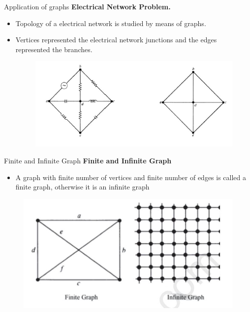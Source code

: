 \documentclass{beamer}
\begin{document}
\begin{frame}{Application of graphs}
	\textbf{Electrical Network Problem.}
	\begin{itemize}
		\item Topology of a electrical network is
		studied by means of graphs. 
		\item Vertices represented the electrical
		network junctions and the edges represented the branches.
		\begin{figure}
			\includegraphics[scale=.5]{img/m13}
		\end{figure}
	\end{itemize}
\end{frame}
\begin{frame}{Finite and Infinite Graph}
	\textbf{Finite and Infinite Graph}
\begin{itemize}
	\item A graph with finite number of vertices and finite number of edges is 
	called a finite graph, otherwise it is an infinite graph
\end{itemize}
	\begin{figure}
	\includegraphics[scale=.5]{img/m14}
\end{figure}
\end{frame}
\end{document}
